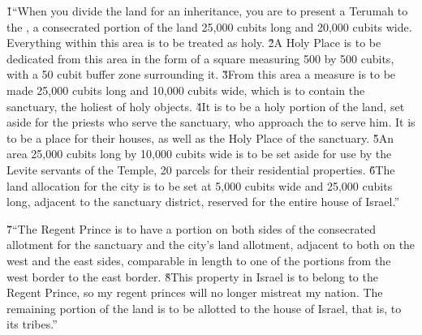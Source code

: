 \v{1}``When you divide the land for an inheritance, you are to present a Terumah to the , a consecrated portion of the land 25,000 cubits long and 20,000 cubits wide. Everything within this area is to be treated as holy. \v{2}A Holy Place is to be dedicated from this area in the form of a square measuring 500 by 500 cubits, with a 50 cubit buffer zone surrounding it. \v{3}From this area a measure is to be made 25,000 cubits long and 10,000 cubits wide, which is to contain the sanctuary, the holiest of holy objects. \v{4}It is to be a holy portion of the land, set aside for the priests who serve the sanctuary, who approach the  to serve him. It is to be a place for their houses, as well as the Holy Place of the sanctuary. \v{5}An area 25,000 cubits long by 10,000 cubits wide is to be set aside for use by the Levite servants of the Temple, 20 parcels for their residential properties. \v{6}The land allocation for the city is to be set at 5,000 cubits wide and 25,000 cubits long, adjacent to the sanctuary district, reserved for the entire house of Israel.''

\v{7}``The Regent Prince is to have a portion on both sides of the consecrated allotment for the sanctuary and the city's land allotment, adjacent to both on the west and the east sides, comparable in length to one of the portions from the west border to the east border. \v{8}This property in Israel is to belong to the Regent Prince, so my regent princes will no longer mistreat my nation. The remaining portion of the land is to be allotted to the house of Israel, that is, to its tribes.''

